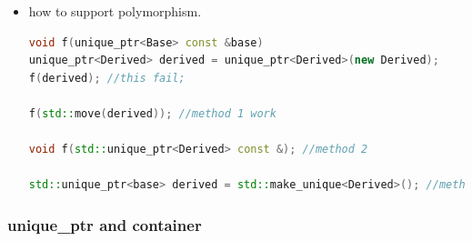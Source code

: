 \documentclass[a4paper,12pt,twoside]{book}
\begin{document}
\begin{itemize}
\item how to support polymorphism.
\begin{lstlisting}[frame=single, language=c++, mathescape=true]
void f(unique_ptr<Base> const &base)
unique_ptr<Derived> derived = unique_ptr<Derived>(new Derived);
f(derived); //this fail;

f(std::move(derived)); //method 1 work

void f(std::unique_ptr<Derived> const &); //method 2

std::unique_ptr<base> derived = std::make_unique<Derived>(); //method 3
\end{lstlisting}


\end{itemize}


\subsubsection{unique\_ptr and container}
\end{document}
